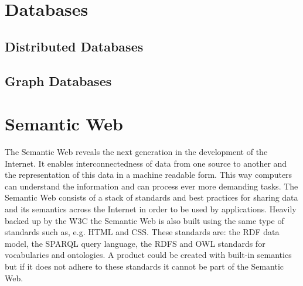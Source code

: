 \section{Databases}
\subsection{Distributed Databases}
\subsection{Graph Databases}
\section{Semantic Web}
The Semantic Web reveals the next generation in the development of the Internet. It enables interconnectedness of data from one source to another and the representation of this data in a machine readable form. This way computers can understand the information and can process ever more demanding tasks. The Semantic Web consists of a stack of standards and best practices for sharing data and its semantics across the Internet in order to be used by applications. Heavily backed up by the W3C the Semantic Web is also built using the same type of standards such as, e.g. HTML and CSS. These standards are: the RDF data model, the SPARQL query language, the RDFS and OWL standards for vocabularies and ontologies. A product could be created with built-in semantics but if it does not adhere to these standards it cannot be part of the Semantic Web. 

